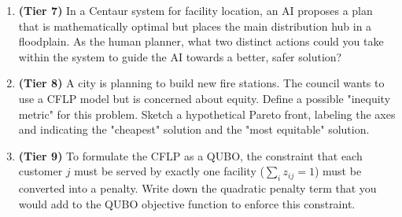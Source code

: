 \documentclass{article}
\begin{document}
\begin{enumerate}
    \item \textbf{(Tier 7)} In a Centaur system for facility location, an AI proposes a plan that is mathematically optimal but places the main distribution hub in a floodplain. As the human planner, what two distinct actions could you take within the system to guide the AI towards a better, safer solution?
    
    \item \textbf{(Tier 8)} A city is planning to build new fire stations. The council wants to use a CFLP model but is concerned about equity. Define a possible "inequity metric" for this problem. Sketch a hypothetical Pareto front, labeling the axes and indicating the "cheapest" solution and the "most equitable" solution.
    
    \item \textbf{(Tier 9)} To formulate the CFLP as a QUBO, the constraint that each customer $j$ must be served by exactly one facility ($\sum_i z_{ij} = 1$) must be converted into a penalty. Write down the quadratic penalty term that you would add to the QUBO objective function to enforce this constraint.
\end{enumerate}
\end{document}
